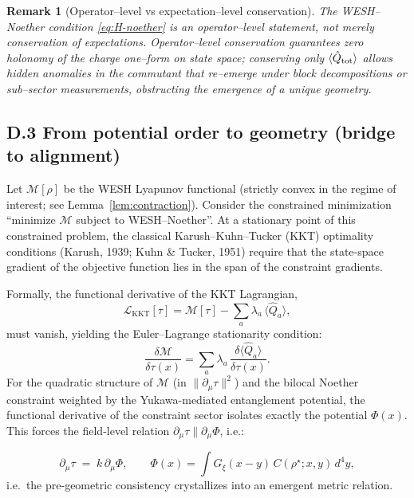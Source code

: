 \documentclass[12pt,a4paper]{article}
\newtheorem{remark}{Remark}[section]
\numberwithin{equation}{section}
\begin{document}
\begin{remark}[Operator–level vs expectation–level conservation]
The WESH–Noether condition \eqref{eq:H-noether} is an operator–level statement, not merely conservation of expectations. Operator–level conservation guarantees zero holonomy of the charge one–form on state space; conserving only $\langle\hat Q_{\rm tot}\rangle$ allows hidden anomalies in the commutant that re–emerge under block decompositions or sub–sector measurements, obstructing the emergence of a unique geometry.
\end{remark}

\vspace{0.3cm}
\subsection*{D.3 From potential order to geometry (bridge to alignment)}
\vspace{0.3cm}
Let $\mathcal M[\rho]$ be the WESH Lyapunov functional (strictly convex in the regime of interest; see Lemma~\ref{lem:contraction}). Consider the constrained minimization ``minimize $\mathcal M$ subject to WESH--Noether''. At a stationary point of this constrained problem, the classical Karush--Kuhn--Tucker (KKT) optimality conditions (Karush, 1939; Kuhn \& Tucker, 1951) require that the state-space gradient of the objective function lies in the span of the constraint gradients.

Formally, the functional derivative of the KKT Lagrangian,
\[
\mathcal{L}_{\mathrm{KKT}}[\tau]
=\mathcal{M}[\tau]
-\sum_a \lambda_a\,\langle\hat Q_a\rangle,
\]
must vanish, yielding the Euler--Lagrange stationarity condition:
\[
\frac{\delta\mathcal{M}}{\delta\tau(x)}
=\sum_a\lambda_a\,\frac{\delta\langle\hat Q_a\rangle}{\delta\tau(x)}.
\]
For the quadratic structure of $\mathcal M$ (in $\|\partial_\mu\tau\|^2$) and the bilocal Noether constraint weighted by the Yukawa-mediated entanglement potential, the functional derivative of the constraint sector isolates exactly the potential $\Phi(x)$. This forces the field-level relation $\partial_\mu\tau \parallel \partial_\mu\Phi$, i.e.:

\begin{equation}
\partial_\mu \tau \;=\; k\,\partial_\mu \Phi,
\qquad
\Phi(x)=\!\int\! G_\xi(x-y)\,C(\rho^\star;x,y)\,d^4y,
\label{eq:alignmentG}
\end{equation}
i.e.\ the pre-geometric consistency crystallizes into an emergent metric relation.
\end{document}
